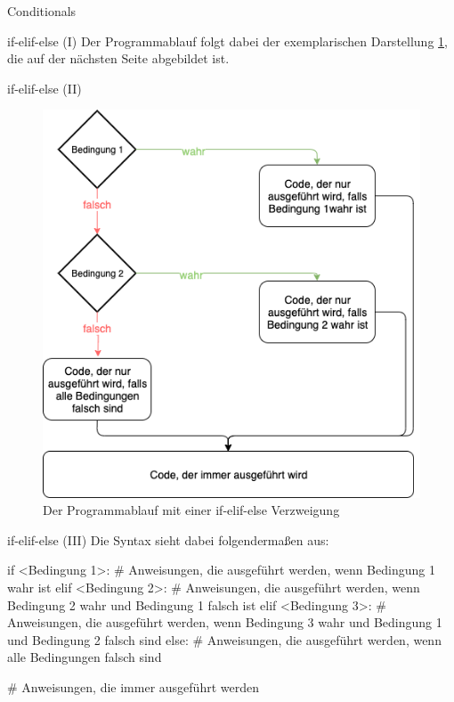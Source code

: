 \begin{subsection}{Conditionals}
\begin{frame}[fragile]{if-elif-else (I)}
            Der Programmablauf folgt dabei der exemplarischen Darstellung \ref{fig:elif}, die auf der nächsten Seite abgebildet ist.
        \end{frame}
        
        \begin{frame}[fragile]{if-elif-else (II)}
            \begin{figure}
                \centering
                \includegraphics[width=0.7\linewidth,height=0.7\textheight,keepaspectratio]{chapters/09_python3_control_flow/figures/elif.png}
                \caption{Der Programmablauf mit einer if-elif-else Verzweigung}
                \label{fig:elif}
            \end{figure}
         \end{frame}
         
         \begin{frame}[fragile]{if-elif-else (III)}
            Die Syntax sieht dabei folgendermaßen aus:
            
\begin{pythoncode}
if <Bedingung 1>:
    # Anweisungen, die ausgeführt werden, wenn Bedingung 1 wahr ist
elif <Bedingung 2>:
    # Anweisungen, die ausgeführt werden, wenn Bedingung 2 wahr und Bedingung 1 falsch ist
elif <Bedingung 3>:
    # Anweisungen, die ausgeführt werden, wenn Bedingung 3 wahr und Bedingung 1 und Bedingung 2 falsch sind
else:
    # Anweisungen, die ausgeführt werden, wenn alle Bedingungen falsch sind
    
# Anweisungen, die immer ausgeführt werden
\end{pythoncode}


\end{frame}
\end{subsection}
